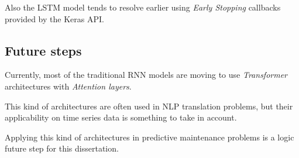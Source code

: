 Also the LSTM model tends to resolve earlier using \textit{Early Stopping} callbacks provided by the Keras API.


\subsection{Future steps}

Currently, most of the traditional RNN models are moving to use \textit{Transformer} architectures with \textit{Attention layers}.

This kind of architectures are often used in NLP translation problems, but their applicability on time series data is something to take in account.

Applying this kind of architectures in predictive maintenance problems is a logic future step for this dissertation.
